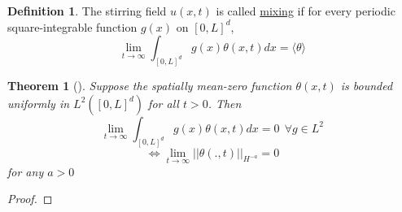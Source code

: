 \documentclass[12pt]{report}   %
\numberwithin{equation}{section}
\theoremstyle{plain}
\newtheorem{theorem}{Theorem}
\theoremstyle{definition}
\newtheorem{definition}[lemma]{Definition}
\theoremstyle{remark}
\begin{document}
  \begin{definition}  
The stirring field $u(x,t)$ is called \underline{mixing} if for every periodic square-integrable function $g(x)$ on $[0,L]^d$, 
  \[ \lim_{t \to \infty} \int_{[0,L]^d} g(x)\theta(x,t) dx = \langle\theta\rangle \]
  \end{definition}
  
  \begin{theorem}[{\cite[Theorem~1]{multi}}]
Suppose the spatially mean-zero function $\theta(x,t)$ is bounded uniformly in $L^2([0,L]^d)$ for all $t>0$. Then
    \[ \lim_{t \to \infty} \int_{[0,L]^d} g(x)\theta(x,t) dx = 0 ~~ \forall g \in L^2\]
    \[ \iff  \lim_{t \to \infty} ||\theta(.,t)||_{H^{-a}} = 0\]
     for any $a>0$
  \end{theorem}
  \begin{proof}


\end{proof}
\end{document}
